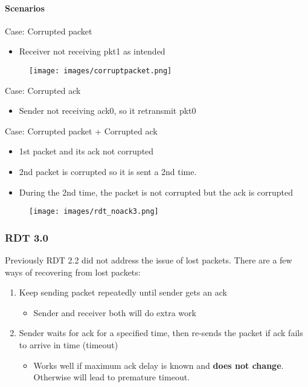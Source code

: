 \documentclass[a4paper]{article}
\begin{document}
\paragraph{Scenarios}\mbox{}

\medskip
\noindent Case: Corrupted packet
\begin{itemize}
    \item Receiver not receiving pkt1 as intended
\end{itemize}
\begin{figure}[H]
    \centering
    \texttt{[image: images/corruptpacket.png]}
\end{figure}

\newpage
\noindent Case: Corrupted ack
\begin{itemize}
    \item Sender not receiving ack0, so it retransmit pkt0
\end{itemize}
Case: Corrupted packet + Corrupted ack
\begin{itemize}
    \item 1st packet and its ack not corrupted
    \item 2nd packet is corrupted so it is sent a 2nd time.
    \item During the 2nd time, the packet is not corrupted but the ack is corrupted
\end{itemize}
\begin{figure}[H]
    \centering
    \texttt{[image: images/rdt\_noack3.png]}
\end{figure}

\subsubsection{RDT 3.0}
Previously RDT 2.2 did not address the issue of lost packets. There are a few ways of recovering from lost packets:
\begin{enumerate}
    \item Keep sending packet repeatedly until sender gets an ack
    \begin{itemize}[label=$\circ$]
        \item Sender and receiver both will do extra work
    \end{itemize}
    \item Sender waits for ack for a specified time, then re-sends the packet if ack fails to arrive in time (timeout)
    \begin{itemize}[label=$\circ$]
        \item Works well if maximum ack delay is known and \textbf{does not change}. Otherwise will lead to premature timeout.
    \end{itemize}
\end{enumerate}
\end{document}
